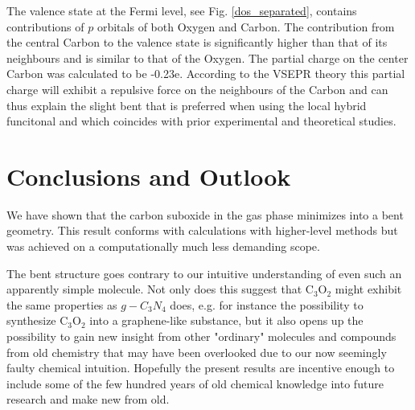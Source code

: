 \documentclass[%
 reprint,
nofootinbib,
 amsmath,amssymb,
 aps,
]{revtex4-2}
\begin{document}
The valence state at the Fermi level, see Fig. \ref{dos_separated}, contains contributions of $p$ orbitals of both Oxygen and Carbon. The contribution from the central Carbon to the valence state is significantly higher than that of its neighbours and is similar to that of the Oxygen. The partial charge on the center Carbon was calculated to be -0.23e. According to the VSEPR\cite{VSEPR} theory this partial charge will exhibit a repulsive force on the neighbours of the Carbon and can thus explain the slight bent that is preferred when using the local hybrid funcitonal and which coincides with prior experimental and theoretical studies\cite{Tortajada, VanderJohns, Jensen,Koput,HimmelKrossingSchnepf}. 


\section{\label{conclusions_and_outlook}Conclusions and Outlook}

We have shown that the carbon suboxide in the gas phase minimizes into a bent geometry. This result conforms with calculations with higher-level methods but was achieved on a computationally much less demanding scope. 

The bent structure goes contrary to our intuitive understanding of even such an apparently simple molecule. Not only does this suggest that C$_3$O$_2$ might exhibit the same properties as $g-C_3N_4$ does, e.g. for instance the possibility to synthesize C$_3$O$_2$ into a graphene-like substance, but it also opens up the possibility to gain new insight from other "ordinary" molecules and compounds from old chemistry that may have been overlooked due to our now seemingly faulty chemical intuition. Hopefully the present results are incentive enough to include some of the few hundred years of old chemical knowledge into future research and make new from old. 


\FloatBarrier
\nocite{*}

\end{document}
